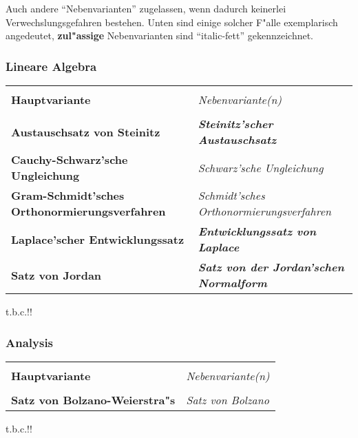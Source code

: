 Auch andere ``Nebenvarianten'' zugelassen, wenn dadurch keinerlei
Verwechslungsgefahren bestehen. Unten sind einige solcher F"alle
exemplarisch angedeutet, \textbf{zul"assige} Nebenvarianten sind
``italic-fett'' gekennzeichnet.


\subsubsection{Lineare Algebra}\label{theoremname_style_lina}

\begin{tabular}{| >{\bfseries}p{65mm} | >{\itshape}p{65mm} |}
\hline
\hline
 & \\
Hauptvariante & Nebenvariante(n)\\
 & \\
\hline
\hline
Austauschsatz von Steinitz & \textbf{Steinitz'scher Austauschsatz}\\
\hline
Cauchy-Schwarz'sche Ungleichung & Schwarz'sche Ungleichung\\
\hline
Gram-Schmidt'sches Orthonormierungsverfahren & Schmidt'sches Orthonormierungsverfahren \\
\hline
Laplace'scher Entwicklungssatz & \textbf{Entwicklungssatz von Laplace}\\
\hline
Satz von Jordan & \textbf{Satz von der Jordan'schen Normalform} \\
\hline
\hline
\end{tabular}

t.b.c.!!

\subsubsection{Analysis}\label{theoremname_style_ana}

\begin{tabular}{| >{\bfseries}p{65mm} | >{\itshape}p{65mm} |}
\hline
\hline
 & \\
Hauptvariante & Nebenvariante(n)\\
 & \\
\hline
\hline
Satz von Bolzano-Weierstra"s & Satz von Bolzano\\
\hline
\hline
\end{tabular}

t.b.c.!!


\clearpage

